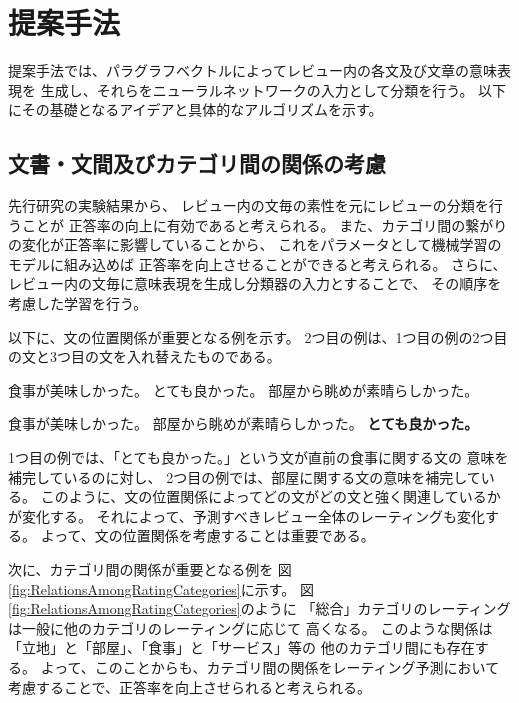 \section{提案手法} \label{sec:ProposedMethod}

提案手法では、パラグラフベクトルによってレビュー内の各文及び文章の意味表現を
生成し、それらをニューラルネットワークの入力として分類を行う。
以下にその基礎となるアイデアと具体的なアルゴリズムを示す。


\subsection{文書・文間及びカテゴリ間の関係の考慮}

先行研究\cite{fujitani15}の実験結果から、
レビュー内の文毎の素性を元にレビューの分類を行うことが
正答率の向上に有効であると考えられる。
また、カテゴリ間の繋がりの変化が正答率に影響していることから、
これをパラメータとして機械学習のモデルに組み込めば
正答率を向上させることができると考えられる。
さらに、レビュー内の文毎に意味表現を生成し分類器の入力とすることで、
その順序を考慮した学習を行う。

以下に、文の位置関係が重要となる例を示す。
2つ目の例は、1つ目の例の2つ目の文と3つ目の文を入れ替えたものである。
\begin{addmargin}{8ex}
  \vspace{1em}
  食事が美味しかった。
  とても良かった。
  部屋から眺めが素晴らしかった。
\end{addmargin}
\begin{addmargin}{8ex}
  \vspace{1em}
  食事が美味しかった。
  部屋から眺めが素晴らしかった。
  \textbf{とても良かった。}
\end{addmargin}
1つ目の例では、「とても良かった。」という文が直前の食事に関する文の
意味を補完しているのに対し、
2つ目の例では、部屋に関する文の意味を補完している。
このように、文の位置関係によってどの文がどの文と強く関連しているかが変化する。
それによって、予測すべきレビュー全体のレーティングも変化する。
よって、文の位置関係を考慮することは重要である。

次に、カテゴリ間の関係が重要となる例を
図\ref{fig:RelationsAmongRatingCategories}に示す。
図\ref{fig:RelationsAmongRatingCategories}のように
「総合」カテゴリのレーティングは一般に他のカテゴリのレーティングに応じて
高くなる。
このような関係は「立地」と「部屋」、「食事」と「サービス」等の
他のカテゴリ間にも存在する。
よって、このことからも、カテゴリ間の関係をレーティング予測において
考慮することで、正答率を向上させられると考えられる。

